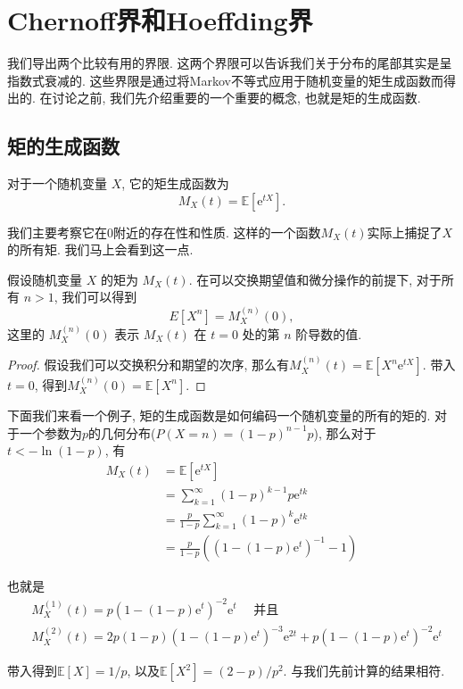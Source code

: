\section{Chernoff界和Hoeffding界}

我们导出两个比较有用的界限. 这两个界限可以告诉我们关于分布的尾部其实是呈指数式衰减的. 这些界限是通过将Markov不等式应用于随机变量的矩生成函数而得出的. 在讨论之前, 我们先介绍重要的一个重要的概念, 也就是矩的生成函数. 

\subsection{矩的生成函数}

\begin{definition}
    对于一个随机变量 $X$, 它的矩生成函数为$$M_X(t)=\mathbb{E}\left[\mathrm{e}^{t X}\right].$$
\end{definition}

我们主要考察它在0附近的存在性和性质. 这样的一个函数$M_X(t)$实际上捕捉了$X$的所有矩. 我们马上会看到这一点.

\begin{theorem}
    假设随机变量 $X$ 的矩为 $M_X(t)$. 
在可以交换期望值和微分操作的前提下, 对于所有 $n > 1$, 我们可以得到
$$E[X^n] = M_X^{(n)}(0),$$这里的 $M_X^{(n)}(0)$ 表示 $M_X(t)$ 在 $t = 0$ 处的第 $n$ 阶导数的值. 

\end{theorem}
\begin{proof}
    假设我们可以交换积分和期望的次序, 那么有$M_X^{(n)}(t)=\mathbb{E}\left[X^n \mathrm{e}^{t X}\right]$. 带入$t=0$, 得到$M_X^{(n)}(0)=\mathbb{E}\left[X^n\right]$. 
\end{proof}

\begin{example}
    下面我们来看一个例子, 矩的生成函数是如何编码一个随机变量的所有的矩的. 对于一个参数为$p$的几何分布($P(X=n)=(1-p)^{n-1} p$), 那么对于$t<-\ln(1-p)$, 有
    $$\begin{aligned} M_X(t) & =\mathbb{E}\left[\mathrm{e}^{t X}\right] \\ & =\sum_{k=1}^{\infty}(1-p)^{k-1} p \mathrm{e}^{t k} \\ & =\frac{p}{1-p} \sum_{k=1}^{\infty}(1-p)^k \mathrm{e}^{t k} \\ & =\frac{p}{1-p}\left(\left(1-(1-p) \mathrm{e}^t\right)^{-1}-1\right)\end{aligned}$$

    也就是
    $$\begin{aligned} & M_X^{(1)}(t)=p\left(1-(1-p) \mathrm{e}^t\right)^{-2} \mathrm{e}^t \quad \text { 并且 } \\ & M_X^{(2)}(t)=2 p(1-p)\left(1-(1-p) \mathrm{e}^t\right)^{-3} \mathrm{e}^{2 t}+p\left(1-(1-p) \mathrm{e}^t\right)^{-2} \mathrm{e}^t\end{aligned}$$

    带入得到$\mathbb{E}[X]=1 / p$, 以及$\mathbb{E}\left[X^2\right]=(2-p) / p^2$. 与我们先前计算的结果相符.
\end{example}


